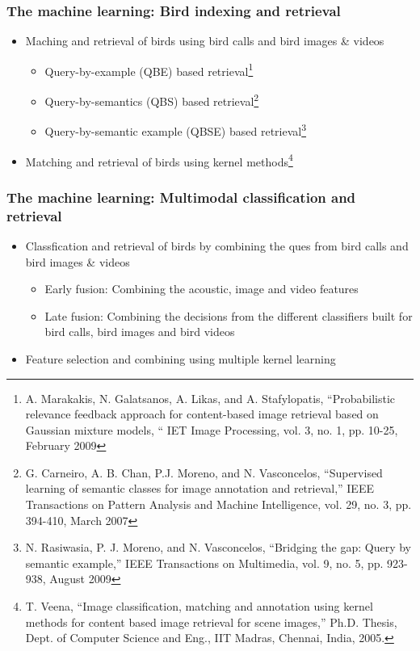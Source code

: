 \documentclass[mathserif]{beamer}
\begin{document}
\begin{frame}
\frametitle{The machine learning: Bird indexing and retrieval}
\begin{itemize}
\item<2-> Maching and retrieval of birds using bird calls and bird images \& videos
\begin{itemize}
      \item Query-by-example (QBE) based retrieval\footnote{
	A. Marakakis, N. Galatsanos, A. Likas, and A. Stafylopatis, “Probabilistic relevance feedback approach for content-based image retrieval based on Gaussian mixture models, “ IET Image Processing, vol. 3, no. 1, pp. 10-25, February 2009}
      \item Query-by-semantics (QBS) based retrieval\footnote{
	G. Carneiro, A. B. Chan, P.J. Moreno, and N. Vasconcelos, “Supervised learning of semantic classes for image annotation and retrieval,” IEEE Transactions on Pattern Analysis and Machine Intelligence, vol. 29, no. 3, pp. 394-410, March 2007}
      \item Query-by-semantic example (QBSE) based retrieval\footnote{
	N. Rasiwasia, P. J. Moreno, and N. Vasconcelos, “Bridging the gap: Query by semantic example,” IEEE Transactions on Multimedia, vol. 9, no. 5, pp. 923-938, August 2009}
\end{itemize}
\item<3-> Matching and retrieval of birds using kernel methods\footnote{
	T. Veena, “Image classification, matching and annotation using kernel methods for content based image retrieval for scene images,” Ph.D. Thesis, Dept. of Computer Science and Eng., IIT Madras, Chennai, India, 2005.}   
\end{itemize}
\end{frame}

\begin{frame}
\frametitle{The machine learning: Multimodal classification and retrieval}
\begin{itemize}
\item<2-> Classfication and retrieval of birds by combining the ques from bird calls and bird images \& videos
\begin{itemize}
      \item Early fusion: Combining the acoustic, image and video features
      \item Late fusion: Combining the decisions from the different classifiers built for bird calls, bird images and bird videos
 \end{itemize}
\item<3-> Feature selection and combining using multiple kernel learning
\end{itemize}
\end{frame}
\end{document}
